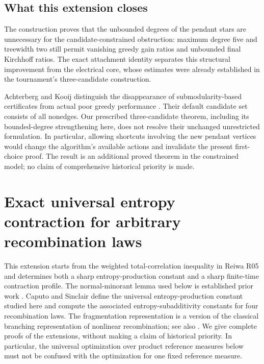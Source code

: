 \documentclass[11pt,a4paper]{article}
\theoremstyle{definition}\newtheorem{definition}[theorem]{Definition}
\theoremstyle{remark}\newtheorem{remark}[theorem]{Remark}
\numberwithin{equation}{section}
\begin{document}
\subsection{What this extension closes}

The construction proves that the unbounded degrees of the pendant stars are
unnecessary for the candidate-constrained obstruction: maximum degree five and
treewidth two still permit vanishing greedy gain ratios and unbounded final
Kirchhoff ratios.  The exact attachment identity separates this structural
improvement from the electrical core, whose estimates were already established
in the tournament's three-candidate construction.

Achterberg and Kooij distinguish the disappearance of submodularity-based
certificates from actual poor greedy performance \cite{ref052}.
Their default candidate set consists of all nonedges.  Our prescribed
three-candidate theorem, including its bounded-degree strengthening here,
does not resolve their unchanged unrestricted formulation.  In particular,
allowing shortcuts involving the new pendant vertices would change the
algorithm's available actions and invalidate the present first-choice proof.
The result is an additional proved theorem in the constrained model; no claim
of comprehensive historical priority is made.


\clearpage
{}
\section{Exact universal entropy contraction for arbitrary recombination laws}
\label{ext-reiwa-section}

This extension starts from the weighted total-correlation inequality in
Reiwa R05 and determines both a sharp entropy-production constant and a
sharp finite-time contraction profile.  The normal-minorant lemma used
below is established prior work \cite[Lemma~3.10]{ref067}.
Caputo and Sinclair \cite{ext-reiwa-CS} define the universal
entropy-production constant studied here and compute the associated
entropy-subadditivity constants for four recombination laws.  The
fragmentation representation is a version of the classical branching
representation of nonlinear recombination; see also
\cite{ext-reiwa-CP}.  We give complete proofs of the extensions, without
making a claim of historical priority.  In particular, the universal
optimization over product reference measures below must not be confused
with the optimization for one fixed reference measure.
\end{document}
